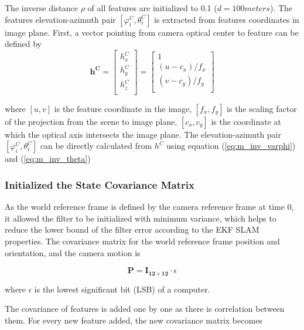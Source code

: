 The inverse distance $\rho$ of all features are initialized to 0.1
($d=100 meters$). The features elevation-azimuth pair $[\varphi _{i}^{C},
\theta _{i}^{C}]$ is extracted from features coordinates in image
plane. First, a vector pointing from camera optical center to feature
can be defined by
\begin{equation}
\label{eq:init_feature_unit_vec}
\mathbf{h^{C}}=\begin{bmatrix}
h_{x}^{C}\\
h_{y}^{C}\\
h_{z}^{C}\\
\end{bmatrix}
 = \begin{bmatrix}
1 \\
(u-c_x)/f_{x} \\
(v-c_y)/f_{y} \\
\end{bmatrix}
\end{equation}

\noindent where $[u, v]$ is the feature coordinate in the image, $
[f_{x}, f_{y}]$ is the scaling factor of the projection from the scene
to image plane, $[c_x, c_y]$ is the coordinate at which the optical axis
intersects the image plane. The elevation-azimuth pair $[\varphi
_{i}^{C}, \theta _{i}^{C}]$ can be directly calculated from
$h^{C}$ using equation (\ref{eq:m_inv_varphi}) and (\ref{eq:m_inv_theta})

\subsubsection{Initialized the State Covariance Matrix}

As the world reference frame is defined by the camera reference frame
at time 0, it allowed the filter to be initialized with minimum
variance, which helps to reduce the lower bound of the filter error
according to the EKF SLAM properties. The covariance matrix for the
world reference frame position and orientation, and the camera motion is

\begin{equation}
\label{eq:Pinit}
\mathbf{P}=\mathbf{I_{12\times 12}}\cdot \epsilon 
\end{equation}

\noindent where $\epsilon $ is the lowest significant bit (LSB) of a
computer.

The covariance of features is added one by one as there is 
correlation between them. For every new feature added, the new 
covariance matrix becomes

